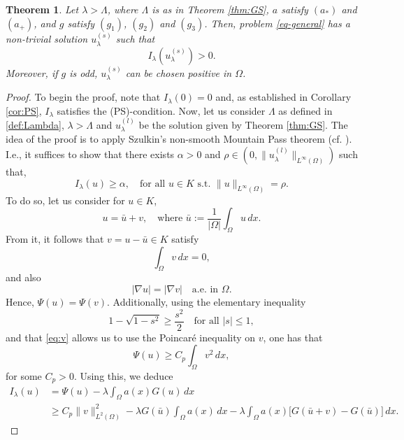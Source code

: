 \documentclass[11pt,reqno]{amsart}
\theoremstyle{plain}
\newtheorem{theorem}{Theorem}[section]
\theoremstyle{definition}
\numberwithin{equation}{section}
\begin{document}
\begin{theorem} \label{thm:MP}
    Let $\lambda >\Lambda$, where $\Lambda$ is as in Theorem \ref{thm:GS}, $a$ satisfy $(a_*)$ and $(a_+)$, and $g$ satisfy $(g_1)$, $(g_2)$ and $(g_3)$. Then, problem \eqref{eq-general} has a non-trivial solution $u_\lambda^{(s)}$ such that
    $$I_\lambda(u_\lambda^{(s)}) > 0.$$
    Moreover, if $g$ is odd, $u_\lambda^{(s)}$ can be chosen positive in $\Omega$.
\end{theorem}
\begin{proof}
To begin the proof, note that $I_\lambda(0) = 0$ and, as established in Corollary \ref{cor:PS}, $I_\lambda$ satisfies the (PS)-condition. Now, let us consider $\Lambda$ as defined in \eqref{def:Lambda}, $\lambda > \Lambda$ and $u_\lambda^{(l)}$ be the solution given by Theorem \ref{thm:GS}. The idea of the proof is to apply Szulkin's non-smooth Mountain Pass theorem (cf. \cite[Theorem 3.2]{Sz86}). I.e., it suffices to show that there exists $\alpha >0$ and $\rho \in (0, \|u_\lambda^{(l)}\|_{L^{\infty}(\Omega) }) $ such that,
    \begin{equation}\label{eq:MP} I_\lambda(u) \geq \alpha , \quad \text{for all } u \in K \text{ s.t. } \|u\|_{L^{\infty}(\Omega)} = \rho.\end{equation}
    To do so, let us consider for $u \in K$, 
    $$u = \bar u + v, \quad \text{where } \bar u := \frac{1}{|\Omega|}\int_\Omega u \, dx.$$
    From it, it follows that $v = u - \bar u \in K$ satisfy \begin{equation} \label{eq:v} \int_\Omega v \, dx= 0,\end{equation} and also
    $$|\nabla u| = |\nabla v| \quad \text{a.e. in } \Omega.$$
    Hence, $\Psi(u) = \Psi(v)$. Additionally, using the elementary inequality
    $$1-\sqrt{1-s^2} \geq \frac{s^2}2 \quad \text{for all } |s| \leq 1,$$
   and that \eqref{eq:v} allows us to use the Poincaré inequality on $v$, one has that 
    \begin{equation}\label{eq:Psiest} \Psi(u) \geq C_p \int_\Omega v^2 \, dx,\end{equation}
    for some $C_p>0$. Using this, we deduce
    \begin{equation} \label{eq:estI1}\begin{aligned} I_\lambda(u) &= \Psi(u) - \lambda \int_\Omega a(x) G(u) \, dx \\
    &\geq C_p \|v\|_{L^2(\Omega)}^2 - \lambda G(\bar u) \int_{\Omega} a(x) \, dx - \lambda \int_{\Omega} a(x) \big[G(\bar u + v) - G(\bar u ) \big] \, dx.\end{aligned}\end{equation}

\end{proof}
\end{document}
